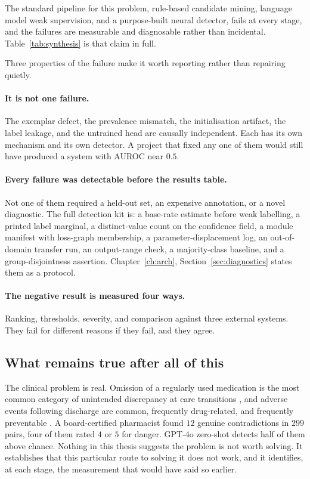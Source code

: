 The standard pipeline for this problem, rule-based candidate mining, language
model weak supervision, and a purpose-built neural detector, fails at every
stage, and the failures are measurable and diagnosable rather than incidental.
Table~\ref{tab:synthesis} is that claim in full.

Three properties of the failure make it worth reporting rather than repairing
quietly.

\paragraph{It is not one failure.} The exemplar defect, the prevalence mismatch,
the initialisation artifact, the label leakage, and the untrained head are
causally independent. Each has its own mechanism and its own detector. A project
that fixed any one of them would still have produced a system with AUROC near
$0.5$.

\paragraph{Every failure was detectable before the results table.} Not one of
them required a held-out set, an expensive annotation, or a novel diagnostic.
The full detection kit is: a base-rate estimate before weak labelling, a printed
label marginal, a distinct-value count on the confidence field, a module
manifest with loss-graph membership, a parameter-displacement log, an
out-of-domain transfer run, an output-range check, a majority-class baseline,
and a group-disjointness assertion. Chapter~\ref{ch:arch},
Section~\ref{sec:diagnostics} states them as a protocol.

\paragraph{The negative result is measured four ways.} Ranking, thresholds,
severity, and comparison against three external systems. They fail for different
reasons if they fail, and they agree.

\subsection{What remains true after all of this}

The clinical problem is real. Omission of a regularly used medication is the
most common category of unintended discrepancy at care transitions
\citep{cornish2005discrepancies}, and adverse events following discharge are
common, frequently drug-related, and frequently preventable
\citep{forster2003adverse}. A board-certified pharmacist found $12$ genuine
contradictions in $299$ pairs, four of them rated $4$ or $5$ for danger. GPT-4o
zero-shot detects half of them above chance. Nothing in this thesis suggests the
problem is not worth solving. It establishes that this particular route to
solving it does not work, and it identifies, at each stage, the measurement that
would have said so earlier.

